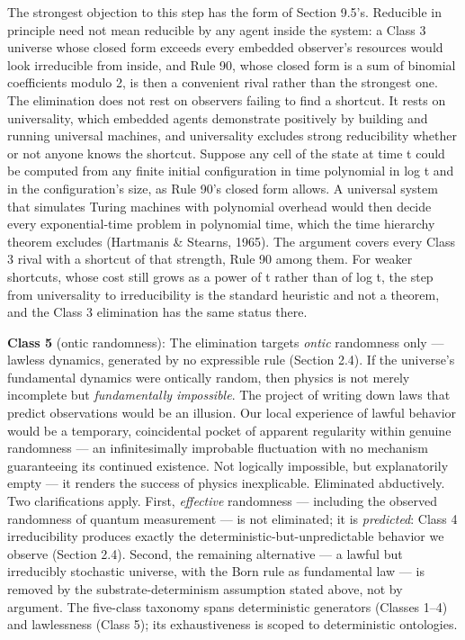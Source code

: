 \documentclass[
]{article}
\begin{document}
The strongest objection to this step has the form of Section 9.5's.
Reducible in principle need not mean reducible by any agent inside the
system: a Class 3 universe whose closed form exceeds every embedded
observer's resources would look irreducible from inside, and Rule 90,
whose closed form is a sum of binomial coefficients modulo 2, is then a
convenient rival rather than the strongest one. The elimination does not
rest on observers failing to find a shortcut. It rests on universality,
which embedded agents demonstrate positively by building and running
universal machines, and universality excludes strong reducibility
whether or not anyone knows the shortcut. Suppose any cell of the state
at time t could be computed from any finite initial configuration in
time polynomial in log t and in the configuration's size, as Rule 90's
closed form allows. A universal system that simulates Turing machines
with polynomial overhead would then decide every exponential-time
problem in polynomial time, which the time hierarchy theorem excludes
(Hartmanis \& Stearns, 1965). The argument covers every Class 3 rival
with a shortcut of that strength, Rule 90 among them. For weaker
shortcuts, whose cost still grows as a power of t rather than of log t,
the step from universality to irreducibility is the standard heuristic
and not a theorem, and the Class 3 elimination has the same status
there.

\textbf{Class 5} (ontic randomness): The elimination targets
\emph{ontic} randomness only --- lawless dynamics, generated by no
expressible rule (Section 2.4). If the universe's fundamental dynamics
were ontically random, then physics is not merely incomplete but
\emph{fundamentally impossible}. The project of writing down laws that
predict observations would be an illusion. Our local experience of
lawful behavior would be a temporary, coincidental pocket of apparent
regularity within genuine randomness --- an infinitesimally improbable
fluctuation with no mechanism guaranteeing its continued existence. Not
logically impossible, but explanatorily empty --- it renders the success
of physics inexplicable. Eliminated abductively. Two clarifications
apply. First, \emph{effective} randomness --- including the observed
randomness of quantum measurement --- is not eliminated; it is
\emph{predicted}: Class 4 irreducibility produces exactly the
deterministic-but-unpredictable behavior we observe (Section 2.4).
Second, the remaining alternative --- a lawful but irreducibly
stochastic universe, with the Born rule as fundamental law --- is
removed by the substrate-determinism assumption stated above, not by
argument. The five-class taxonomy spans deterministic generators
(Classes 1--4) and lawlessness (Class 5); its exhaustiveness is scoped
to deterministic ontologies.
\end{document}
